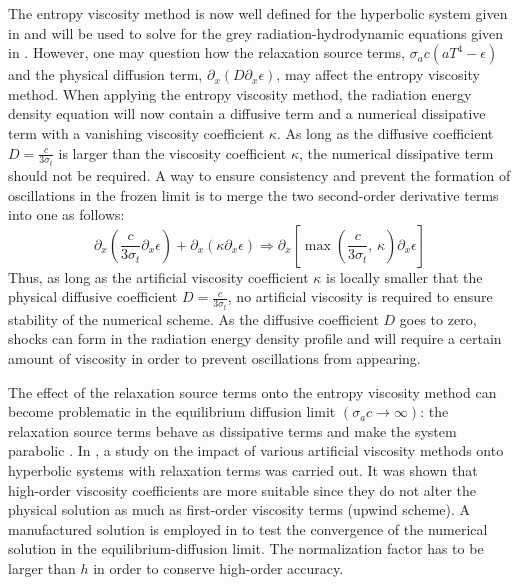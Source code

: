 The entropy viscosity method is now well defined for the hyperbolic system given in  and will be used to solve for the grey radiation-hydrodynamic equations given in . However, one may question how the relaxation source terms, $\sigma_a c (a T^4-\epsilon)$ and the physical diffusion term, $\partial_x(D\partial_x \epsilon)$, may affect the entropy viscosity method. When applying the entropy viscosity method, the radiation energy density equation will now contain a diffusive term and a numerical dissipative term with a vanishing viscosity coefficient $\kappa$. As long as the diffusive coefficient $D=\frac{c}{3 \sigma_t}$ is larger than the viscosity coefficient $\kappa$, the numerical dissipative term should not be required. A way to ensure consistency and prevent the formation of oscillations in the frozen limit is to merge the two second-order derivative terms into one as follows:
\begin{equation}
 \partial_x \left( \frac{c}{3 \sigma_t} \partial_x \epsilon \right) + \partial_x \left( \kappa \partial_x \epsilon \right) 
 \Longrightarrow
 \partial_x \left[ \max\left(\frac{c}{3 \sigma_t} \text{, } \kappa \right) \partial_x \epsilon \right]
\end{equation}
Thus, as long as the artificial viscosity coefficient $\kappa$ is locally smaller that the physical diffusive coefficient $D=\frac{c}{3 \sigma_t}$, no artificial viscosity is required to ensure stability of the numerical scheme. As the diffusive coefficient $D$ goes to zero, shocks can form in the radiation energy density profile and will require a certain amount of viscosity in order to prevent oscillations from appearing.

The effect of the relaxation source terms onto the entropy viscosity method can become problematic in the equilibrium diffusion limit $(\sigma_a c \to \infty)$: the relaxation source terms behave as dissipative terms and make the system parabolic \cite{Leveque}. In \cite{ShiJin}, a study on the impact of various artificial viscosity methods onto hyperbolic systems with relaxation terms was carried out. It was shown that high-order viscosity coefficients are more suitable since they do not alter the physical solution as much as first-order viscosity terms (upwind scheme). A manufactured  solution is employed in  to test the convergence of the numerical solution in the equilibrium-diffusion limit.  
The normalization factor has to be larger than $h$ in order to conserve high-order accuracy.

